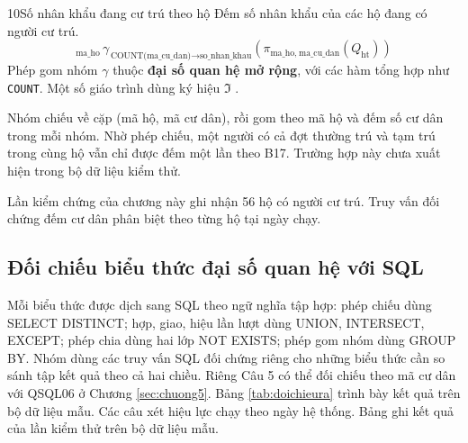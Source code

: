 \begin{racau}{10}{Số nhân khẩu đang cư trú theo hộ}
Đếm số nhân khẩu của các hộ đang có người cư trú.
\begin{equation*}
{}_{\text{ma\_ho}}\,\gamma_{\,\text{COUNT(ma\_cu\_dan)} \rightarrow \text{so\_nhan\_khau}}\left(\pi_{\text{ma\_ho},\ \text{ma\_cu\_dan}}(Q_{\mathrm{ht}})\right)
\end{equation*}
Phép gom nhóm $\gamma$ thuộc \textbf{đại số quan hệ mở rộng}, với các hàm tổng hợp như \texttt{COUNT}. Một số giáo trình dùng ký hiệu $\Im$ \cite{elmasri,silberschatz}.

Nhóm chiếu về cặp (mã hộ, mã cư dân), rồi gom theo mã hộ và đếm số cư dân trong mỗi nhóm. Nhờ phép chiếu, một người có cả đợt thường trú và tạm trú trong cùng hộ vẫn chỉ được đếm một lần theo B17. Trường hợp này chưa xuất hiện trong bộ dữ liệu kiểm thử.

Lần kiểm chứng của chương này ghi nhận 56 hộ có người cư trú. Truy vấn đối chứng đếm cư dân phân biệt theo từng hộ tại ngày chạy.
\end{racau}

\clearpage
\subsection*{Đối chiếu biểu thức đại số quan hệ với SQL}

Mỗi biểu thức được dịch sang SQL theo ngữ nghĩa tập hợp: phép chiếu dùng SELECT DISTINCT; hợp, giao, hiệu lần lượt dùng UNION, INTERSECT, EXCEPT; phép chia dùng hai lớp NOT EXISTS; phép gom nhóm dùng GROUP BY. Nhóm dùng các truy vấn SQL đối chứng riêng cho những biểu thức cần so sánh tập kết quả theo cả hai chiều. Riêng Câu 5 có thể đối chiếu theo mã cư dân với QSQL06 ở Chương \ref{sec:chuong5}. Bảng \ref{tab:doichieura} trình bày kết quả trên bộ dữ liệu mẫu. Các câu xét hiệu lực chạy theo ngày hệ thống. Bảng ghi kết quả của lần kiểm thử trên bộ dữ liệu mẫu.

